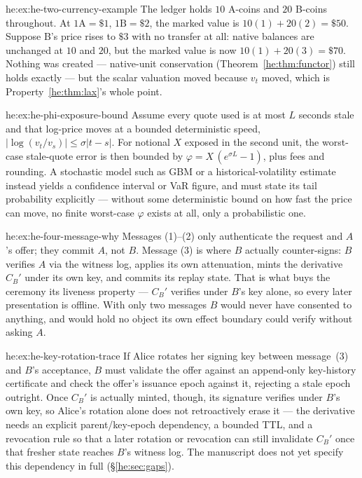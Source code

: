 \begin{pdSolution}{he:ex:he-two-currency-example}
The ledger holds $10$ A-coins and $20$ B-coins throughout. At
$1\text{A}=\$1$, $1\text{B}=\$2$, the marked value is $10(1)+20(2)=\$50$. Suppose
B's price rises to $\$3$ with no transfer at all: native balances are unchanged
at $10$ and $20$, but the marked value is now $10(1)+20(3)=\$70$. Nothing was
created --- native-unit conservation (Theorem~\ref{he:thm:functor}) still holds
exactly --- but the scalar valuation moved because $v_t$ moved, which is
Property~\ref{he:thm:lax}'s whole point.
\end{pdSolution}
\begin{pdSolution}{he:ex:he-phi-exposure-bound}
Assume every quote used is at most $L$ seconds stale and that log-price
moves at a bounded deterministic speed, $|\log(v_t/v_s)|\le\sigma|t-s|$. For
notional $X$ exposed in the second unit, the worst-case stale-quote error is then
bounded by $\varphi = X\,(e^{\sigma L}-1)$, plus fees and rounding. A stochastic
model such as GBM or a historical-volatility estimate instead yields a
confidence interval or VaR figure, and must state its tail probability
explicitly --- without some deterministic bound on how fast the price can move,
no finite worst-case $\varphi$ exists at all, only a probabilistic one.
\end{pdSolution}
\begin{pdSolution}{he:ex:he-four-message-why}
Messages (1)--(2) only authenticate the request and $A$'s offer; they commit
$A$, not $B$. Message (3) is where $B$ actually counter-signs: $B$ verifies $A$
via the witness log, applies its own attenuation, mints the derivative $C_B'$
under its own key, and commits its replay state. That is what buys the ceremony
its liveness property --- $C_B'$ verifies under $B$'s key alone, so every later
presentation is offline. With only two messages $B$ would never have consented
to anything, and would hold no object its own effect boundary could verify
without asking $A$.
\end{pdSolution}
\begin{pdSolution}{he:ex:he-key-rotation-trace}
If Alice rotates her signing key between message~(3) and $B$'s acceptance,
$B$ must validate the offer against an append-only key-history certificate and
check the offer's issuance epoch against it, rejecting a stale epoch outright.
Once $C_B'$ is actually minted, though, its signature verifies under $B$'s own
key, so Alice's rotation alone does not retroactively erase it --- the
derivative needs an explicit parent/key-epoch dependency, a bounded TTL, and a
revocation rule so that a later rotation or revocation can still invalidate
$C_B'$ once that fresher state reaches $B$'s witness log. The manuscript does not
yet specify this dependency in full (\S\ref{he:sec:gaps}).
\end{pdSolution}

